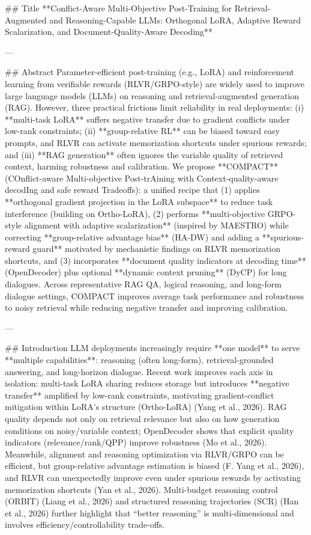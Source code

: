 ## Title  
**Conflict-Aware Multi-Objective Post-Training for Retrieval-Augmented and Reasoning-Capable LLMs: Orthogonal LoRA, Adaptive Reward Scalarization, and Document-Quality-Aware Decoding**

---

## Abstract  
Parameter-efficient post-training (e.g., LoRA) and reinforcement learning from verifiable rewards (RLVR/GRPO-style) are widely used to improve large language models (LLMs) on reasoning and retrieval-augmented generation (RAG). However, three practical frictions limit reliability in real deployments: (i) **multi-task LoRA** suffers negative transfer due to gradient conflicts under low-rank constraints; (ii) **group-relative RL** can be biased toward easy prompts, and RLVR can activate memorization shortcuts under spurious rewards; and (iii) **RAG generation** often ignores the variable quality of retrieved context, harming robustness and calibration.  
We propose **COMPACT** (COnflict-aware Multi-objective Post-trAining with Context-quality-aware decodIng and safe reward Tradeoffs): a unified recipe that (1) applies **orthogonal gradient projection in the LoRA subspace** to reduce task interference (building on Ortho-LoRA), (2) performs **multi-objective GRPO-style alignment with adaptive scalarization** (inspired by MAESTRO) while correcting **group-relative advantage bias** (HA-DW) and adding a **spurious-reward guard** motivated by mechanistic findings on RLVR memorization shortcuts, and (3) incorporates **document quality indicators at decoding time** (OpenDecoder) plus optional **dynamic context pruning** (DyCP) for long dialogues. Across representative RAG QA, logical reasoning, and long-form dialogue settings, COMPACT improves average task performance and robustness to noisy retrieval while reducing negative transfer and improving calibration.  

---

## Introduction  
LLM deployments increasingly require **one model** to serve **multiple capabilities**: reasoning (often long-form), retrieval-grounded answering, and long-horizon dialogue. Recent work improves each axis in isolation: multi-task LoRA sharing reduces storage but introduces **negative transfer** amplified by low-rank constraints, motivating gradient-conflict mitigation within LoRA’s structure (Ortho-LoRA) (Yang et al., 2026). RAG quality depends not only on retrieval relevance but also on how generation conditions on noisy/variable context; OpenDecoder shows that explicit quality indicators (relevance/rank/QPP) improve robustness (Mo et al., 2026). Meanwhile, alignment and reasoning optimization via RLVR/GRPO can be efficient, but group-relative advantage estimation is biased (F. Yang et al., 2026), and RLVR can unexpectedly improve even under spurious rewards by activating memorization shortcuts (Yan et al., 2026). Multi-budget reasoning control (ORBIT) (Liang et al., 2026) and structured reasoning trajectories (SCR) (Han et al., 2026) further highlight that “better reasoning” is multi-dimensional and involves efficiency/controllability trade-offs.

